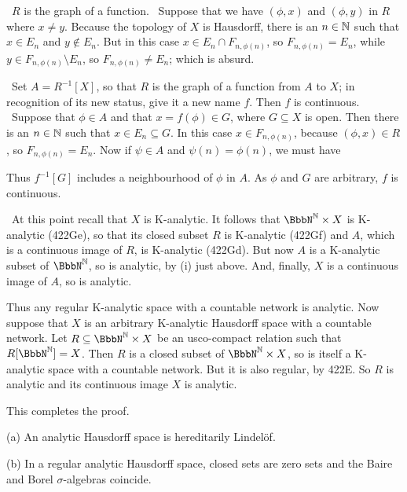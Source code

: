 {\qquad\grheadc\ $R$ is the graph of a function.   \Prf\Quer\ Suppose
that we have $(\phi,x)$ and $(\phi,y)$ in $R$ where $x\ne y$.   Because
the topology of $X$ is Hausdorff, there is an $n\in\Bbb N$ such that
$x\in E_n$ and $y\notin E_n$.   But in this case $x\in E_n\cap
F_{n,\phi(n)}$, so $F_{n,\phi(n)}=E_n$, while $y\in
F_{n,\phi(n)}\setminus E_n$, so
$F_{n,\phi(n)}\ne E_n$;  which is absurd.\ \Bang\Qed

\medskip

\qquad\grheadd\ Set $A=R^{-1}[X]$, so that $R$ is the graph of a
function from $A$ to $X$;  in recognition of its new status, give it a
new name $f$.   Then $f$ is continuous.   \Prf\ Suppose that $\phi\in A$
and that $x=f(\phi)\in G$, where $G\subseteq X$ is open.   Then there is
an $n\in\Bbb N$ such that $x\in E_n\subseteq G$.   In this case $x\in
F_{n,\phi(n)}$, because $(\phi,x)\in R$, so $F_{n,\phi(n)}=E_n$.   Now
if $\psi\in A$ and $\psi(n)=\phi(n)$, we must have


\noindent Thus $f^{-1}[G]$ includes a neighbourhood of $\phi$ in $A$.
As $\phi$ and $G$ are arbitrary, $f$ is continuous.\ \Qed

\medskip

\qquad\grheade\ At this point recall that $X$ is K-analytic.   It
follows that $\NN\times X$ is K-analytic (422Ge), so that its closed
subset $R$ is K-analytic (422Gf) and $A$, which is a continuous image of
$R$, is K-analytic (422Gd).   But now $A$ is a K-analytic subset of
$\NN$, so is analytic, by (i) just above.   And, finally, $X$ is a
continuous image of $A$, so is analytic.

\medskip

 Thus any regular K-analytic space with a countable
network is analytic.  Now suppose that $X$ is an arbitrary K-analytic
Hausdorff space with a countable network.   Let $R\subseteq\NN\times X$
be an usco-compact relation such that $R[\NN]=X$.   Then $R$ is a closed
subset of $\NN\times X$, so is itself a K-analytic space with a
countable network.   But it is also regular, by 422E.   So $R$ is
analytic and its continuous image $X$ is analytic.

This completes the proof.
}%

 (a) An analytic Hausdorff space is
hereditarily Lindel\"of.

(b) In a regular analytic Hausdorff space, closed sets are zero sets
and the Baire and Borel $\sigma$-algebras coincide.

